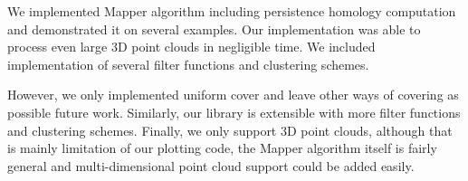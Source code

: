 \documentclass{article}
\begin{document}
We implemented Mapper algorithm including persistence homology computation and demonstrated it on several examples.
Our implementation was able to process even large 3D point clouds in negligible time.
We included implementation of several filter functions and clustering schemes.

However, we only implemented uniform cover and leave other ways of covering as possible future work.
Similarly, our library is extensible with more filter functions and clustering schemes.
Finally, we only support 3D point clouds, although that is mainly limitation of our plotting code, the Mapper algorithm itself is fairly general and multi-dimensional point cloud support could be added easily.



\end{document}
